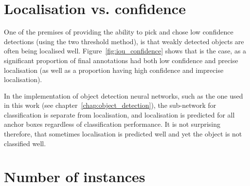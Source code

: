 \section{Localisation vs. confidence}
\label{sec:localisation_confidence}

One of the premises of providing the ability to pick and chose low confidence detections (using the two threshold method), is that weakly detected objects are often being localised well. Figure~\ref{fig:iou_confidence} shows that is the case, as a significant proportion of final annotations had both low confidence and  precise localisation (as well as a proportion having high confidence and imprecise localisation).


\begin{table}[h]
\caption{Breakdown by dataset of detections included as an annotation; confident if $ p > 0.7 $, precise if $ IoU > 0.85 $ with respect to final annotation} 
    \centering
\noindent{}
\label{tab:confidence_precision}
\end{table}

In the implementation of object detection neural networks, such as the one used in this work (see chapter~\ref{chap:object_detection}), the sub-network for classification is separate from localisation, and localisation is predicted for all anchor boxes regardless of classification performance. It is not surprising therefore, that sometimes localisation is predicted well and yet the object is not classified well.


\section{Number of instances}
\label{sec:instances_discussion}

